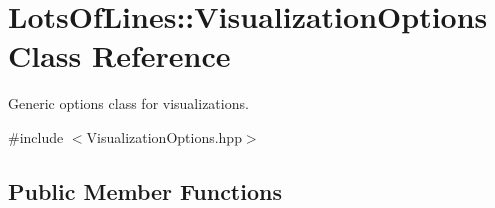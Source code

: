 \hypertarget{class_lots_of_lines_1_1_visualization_options}{}\section{Lots\+Of\+Lines\+:\+:Visualization\+Options Class Reference}
\label{class_lots_of_lines_1_1_visualization_options}


Generic options class for visualizations.  




{\ttfamily \#include $<$Visualization\+Options.\+hpp$>$}

\subsection*{Public Member Functions}
